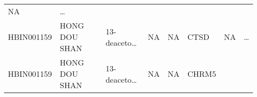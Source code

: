 \documentclass[
]{article}
\begin{document}
\begin{longtable}[]{@{}llllllll@{}}
\begin{minipage}[t]{0.11\columnwidth}
NA\strut
\end{minipage} & \begin{minipage}[t]{0.03\columnwidth}\raggedright
\ldots{}\strut
\end{minipage}\tabularnewline
\begin{minipage}[t]{0.11\columnwidth}\raggedright
HBIN001159\strut
\end{minipage} & \begin{minipage}[t]{0.11\columnwidth}\raggedright
HONG DOU SHAN\strut
\end{minipage} & \begin{minipage}[t]{0.14\columnwidth}\raggedright
13-deaceto\ldots{}\strut
\end{minipage} & \begin{minipage}[t]{0.14\columnwidth}\raggedright
NA\strut
\end{minipage} & \begin{minipage}[t]{0.08\columnwidth}\raggedright
NA\strut
\end{minipage} & \begin{minipage}[t]{0.09\columnwidth}\raggedright
CTSD\strut
\end{minipage} & \begin{minipage}[t]{0.11\columnwidth}\raggedright
NA\strut
\end{minipage} & \begin{minipage}[t]{0.03\columnwidth}\raggedright
\ldots{}\strut
\end{minipage}\tabularnewline
\begin{minipage}[t]{0.11\columnwidth}\raggedright
HBIN001159\strut
\end{minipage} & \begin{minipage}[t]{0.11\columnwidth}\raggedright
HONG DOU SHAN\strut
\end{minipage} & \begin{minipage}[t]{0.14\columnwidth}\raggedright
13-deaceto\ldots{}\strut
\end{minipage} & \begin{minipage}[t]{0.14\columnwidth}\raggedright
NA\strut
\end{minipage} & \begin{minipage}[t]{0.08\columnwidth}\raggedright
NA\strut
\end{minipage} & \begin{minipage}[t]{0.09\columnwidth}\raggedright
CHRM5\strut
\end{minipage} & \begin{minipage}[t]{0.11\columnwidth}\raggedright

\end{minipage}
\end{longtable}
\end{document}
